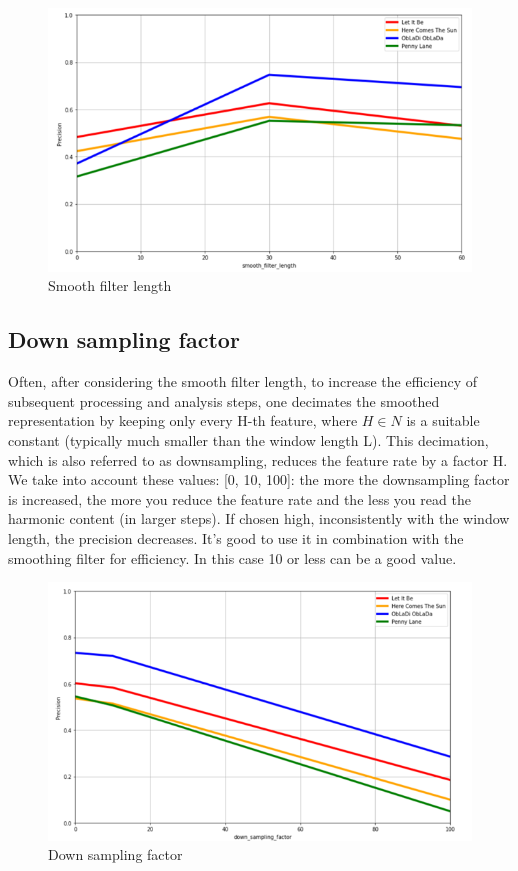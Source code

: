 \documentclass[
	12pt, %
]{fphw}
\begin{document}
\begin{figure}[H]
 \centering
 \includegraphics[scale=1]{./images/5_smooth_precision.png}
 \caption{Smooth filter length}
\end{figure}

\subsection{Down sampling factor}
Often, after considering the smooth filter length, to increase the efficiency of subsequent processing and analysis steps, one decimates the smoothed representation by keeping only every H-th feature, where  \(H \in N\) is a suitable constant (typically much smaller than the window length L). This decimation, which is also referred to as downsampling, reduces the feature rate by a factor H.\\

We take into account these values: [0, 10, 100]: the more the downsampling factor is increased, the more you reduce the feature rate and the less you read the harmonic content (in larger steps). If chosen high, inconsistently with the window length, the precision decreases.
It's good to use it in combination with the smoothing filter for efficiency. In this case 10 or less can be a good value. 

\begin{figure}[H]
 \centering
 \includegraphics[scale=1]{./images/5_down_sampling_precision.png}
 \caption{Down sampling factor}
\end{figure}
\end{document}
